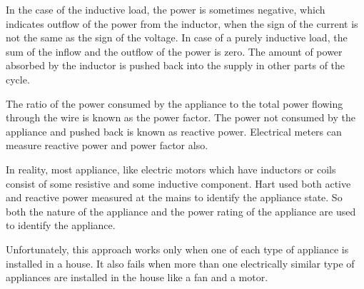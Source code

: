 

In the case of the inductive load, the power is sometimes negative, which indicates outflow of the power from the inductor, when the sign of the current is not the same as the sign of the voltage. In case of a purely inductive load, the sum of the inflow and the outflow of the power is zero. The amount of power absorbed by the inductor is pushed back into the supply in other parts of the cycle.

The ratio of the power consumed by the appliance to the total power flowing through the wire is known as the power factor. The power not consumed by the appliance and pushed back is known as reactive power. Electrical meters can measure reactive power and power factor also.

In reality, most appliance, like electric motors which have inductors or coils consist of some resistive and some inductive component. Hart used both active and reactive power measured at the mains to identify the appliance state. So both the nature of the appliance and the power rating of the appliance are used to identify the appliance.


Unfortunately, this approach works only when one of each type of appliance is installed in a house.  It also fails when more than one electrically similar type of appliances are installed in the house like a fan and a motor.
